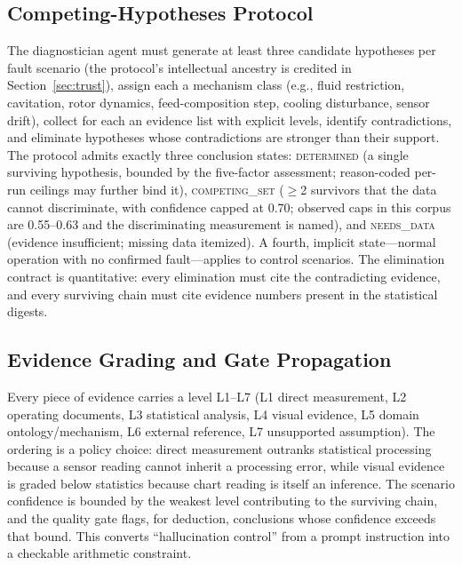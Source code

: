 \documentclass[preprint,12pt]{elsarticle}
\begin{document}
\subsection{Competing-Hypotheses Protocol}
The diagnostician agent must generate at least three candidate hypotheses per fault scenario (the protocol's intellectual ancestry is credited in Section~\ref{sec:trust}), assign each a mechanism class (e.g., fluid restriction, cavitation, rotor dynamics, feed-composition step, cooling disturbance, sensor drift), collect for each an evidence list with explicit levels, identify contradictions, and eliminate hypotheses whose contradictions are stronger than their support. The protocol admits exactly three conclusion states: \mbox{\textsc{determined}} (a single surviving hypothesis, bounded by the five-factor assessment; reason-coded per-run ceilings may further bind it), \mbox{\textsc{competing\_set}} ($\ge$2 survivors that the data cannot discriminate, with confidence capped at 0.70; observed caps in this corpus are 0.55--0.63 and the discriminating measurement is named), and \mbox{\textsc{needs\_data}} (evidence insufficient; missing data itemized). A fourth, implicit state---normal operation with no confirmed fault---applies to control scenarios. The elimination contract is quantitative: every elimination must cite the contradicting evidence, and every surviving chain must cite evidence numbers present in the statistical digests.

\subsection{Evidence Grading and Gate Propagation}\label{sec:method-grading}
Every piece of evidence carries a level L1--L7 (L1 direct measurement, L2 operating documents, L3 statistical analysis, L4 visual evidence, L5 domain ontology/mechanism, L6 external reference, L7 unsupported assumption). The ordering is a policy choice: direct measurement outranks statistical processing because a sensor reading cannot inherit a processing error, while visual evidence is graded below statistics because chart reading is itself an inference. The scenario confidence is bounded by the weakest level contributing to the surviving chain, and the quality gate flags, for deduction, conclusions whose confidence exceeds that bound. This converts ``hallucination control'' from a prompt instruction into a checkable arithmetic constraint.
\end{document}
